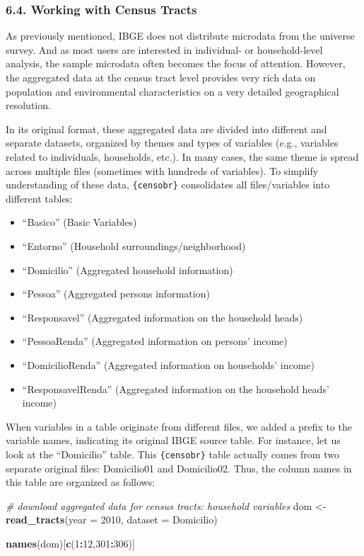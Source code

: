 \documentclass[
]{article}
\newenvironment{Shaded}{\begin{snugshade}}{\end{snugshade}}
\newcommand{\AttributeTok}[1]{\textcolor[rgb]{0.13,0.29,0.53}{#1}}
\newcommand{\CommentTok}[1]{\textcolor[rgb]{0.56,0.35,0.01}{\textit{#1}}}
\newcommand{\DecValTok}[1]{\textcolor[rgb]{0.00,0.00,0.81}{#1}}
\newcommand{\FunctionTok}[1]{\textcolor[rgb]{0.13,0.29,0.53}{\textbf{#1}}}
\newcommand{\NormalTok}[1]{#1}
\newcommand{\OtherTok}[1]{\textcolor[rgb]{0.56,0.35,0.01}{#1}}
\newcommand{\SpecialCharTok}[1]{\textcolor[rgb]{0.81,0.36,0.00}{\textbf{#1}}}
\newcommand{\StringTok}[1]{\textcolor[rgb]{0.31,0.60,0.02}{#1}}
\providecommand{\tightlist}{%
  \setlength{\itemsep}{0pt}\setlength{\parskip}{0pt}}
\begin{document}
\subsubsection{6.4. Working with Census
Tracts}\label{working-with-census-tracts}

As previously mentioned, IBGE does not distribute microdata from the
universe survey. And as most users are interested in individual- or
household-level analysis, the sample microdata often becomes the focus
of attention. However, the aggregated data at the census tract level
provides very rich data on population and environmental characteristics
on a very detailed geographical resolution.

In its original format, these aggregated data are divided into different
and separate datasets, organized by themes and types of variables (e.g.,
variables related to individuals, households, etc.). In many cases, the
same theme is spread across multiple files (sometimes with hundreds of
variables). To simplify understanding of these data,
\texttt{\{censobr\}} consolidates all files/variables into different
tables:

\begin{itemize}
\tightlist
\item
  ``Basico'' (Basic Variables)
\item
  ``Entorno'' (Household surroundings/neighborhood)
\item
  ``Domicilio'' (Aggregated household information)
\item
  ``Pessoa'' (Aggregated persons information)
\item
  ``Responsavel'' (Aggregated information on the household heads)
\item
  ``PessoaRenda'' (Aggregated information on persons' income)
\item
  ``DomicilioRenda'' (Aggregated information on households' income)
\item
  ``ResponsavelRenda'' (Aggregated information on the household heads'
  income)
\end{itemize}

When variables in a table originate from different files, we added a
prefix to the variable names, indicating its original IBGE source table.
For instance, let us look at the ``Domicilio'' table. This
\texttt{\{censobr\}} table actually comes from two separate original
files: Domicilio01 and Domicilio02. Thus, the column names in this table
are organized as follows:

\begin{Shaded}
\begin{Highlighting}[]
\CommentTok{\# download aggregated data for census tracts: household variables}
\NormalTok{dom }\OtherTok{\textless{}{-}} \FunctionTok{read\_tracts}\NormalTok{(}\AttributeTok{year =} \DecValTok{2010}\NormalTok{,}
                   \AttributeTok{dataset =} \StringTok{\textquotesingle{}Domicilio\textquotesingle{}}\NormalTok{)}

\FunctionTok{names}\NormalTok{(dom)[}\FunctionTok{c}\NormalTok{(}\DecValTok{1}\SpecialCharTok{:}\DecValTok{12}\NormalTok{,}\DecValTok{301}\SpecialCharTok{:}\DecValTok{306}\NormalTok{)]}
\end{Highlighting}
\end{Shaded}
\end{document}
